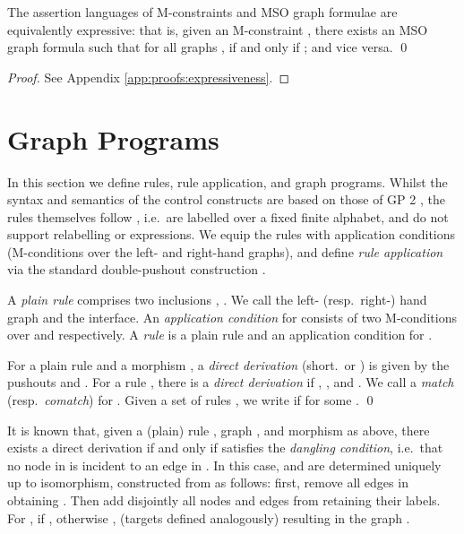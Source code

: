\documentclass{llncs}
\begin{document}
	\begin{theorem}\label{thm:formulae_equiv}\rm
		The assertion languages of M-constraints and MSO graph formulae are equivalently expressive: that is, given an M-constraint , there exists an MSO graph formula  such that for all graphs ,  if and only if ; and vice versa.
		\qed
	\end{theorem}
	
	\begin{proof}
		See Appendix \ref{app:proofs:expressiveness}.
	\end{proof}
	

	
	
		\section{Graph Programs}\label{sec:graph_programs}

		In this section we define rules, rule application, and graph programs. Whilst the syntax and semantics of the control constructs are based on those of GP 2 \cite{Plump12a}, the rules themselves follow \cite{Habel-Pennemann-Rensink06a,Pennemann09a}, i.e.\ are labelled over a fixed finite alphabet, and do not support relabelling or expressions. We equip the rules with application conditions (M-conditions over the left- and right-hand graphs), and define \emph{rule application} via the standard double-pushout construction \cite{Ehrig-Ehrig-Prange-Taentzer06a}.
		
		\begin{definition}\label{def:rule}\rm
			A \emph{plain rule}  comprises two inclusions , . We call  the left- (resp.\ right-) hand graph and  the interface. An \emph{application condition}  for  consists of two M-conditions over  and  respectively. A \emph{rule}  is a plain rule  and an application condition  for .
			
			
			For a plain rule  and a morphism , a \emph{direct derivation}  (short.\  or ) is given by the pushouts  and . For a rule , there is a \emph{direct derivation}  if , , and . We call  a \emph{match} (resp.\ \emph{comatch}) for . Given a set of rules , we write  if  for some .
			\qed
		\end{definition}
		
		It is known that, given a (plain) rule , graph , and morphism  as above, there exists a direct derivation if and only if  satisfies the \emph{dangling condition}, i.e.\ that no node in  is incident to an edge in . In this case,  and  are determined uniquely up to isomorphism, constructed from  as follows: first, remove all edges in  obtaining . Then add disjointly all nodes and edges from  retaining their labels. For ,  if , otherwise , (targets defined analogously) resulting in the graph .
\end{document}
